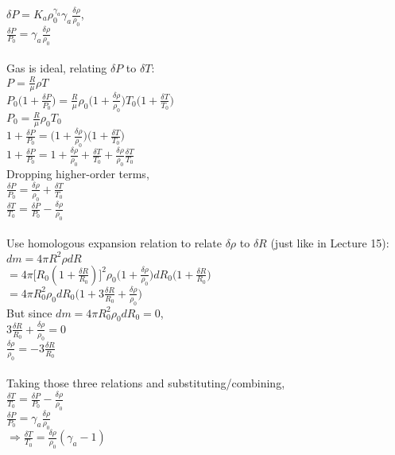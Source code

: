 \documentclass[]{article}
\begin{document}
\begin{enumerate}
{\begin{enumerate}
{		$\delta P = K_a \rho_0^{\gamma_a}\gamma_a\frac{\delta\rho}{\rho_0}$,
		\\
		$\frac{\delta P}{P_0} = \gamma_a\frac{\delta\rho}{\rho_0}$
		\\\\
		Gas is ideal, relating $\delta P$ to $\delta T$:
		\\
		$P = \frac{R}{\mu}\rho T$
		\\
		$P_0 \big(1 + \frac{\delta P}{P_0}\big) = \frac{R}{\mu}\rho_0\big(1+ \frac{\delta\rho}{\rho_0}\big) T_0\big(1 + \frac{\delta T}{T_0}\big)$
		\\
		$P_0 = \frac{R}{\mu}\rho_0 T_0$
		\\
		$1 + \frac{\delta P}{P_0} = \big(1+ \frac{\delta\rho}{\rho_0}\big) \big(1 + \frac{\delta T}{T_0}\big)$
		\\
		$1 + \frac{\delta P}{P_0} = 1+ \frac{\delta\rho}{\rho_0} + \frac{\delta T}{T_0} +  \frac{\delta\rho}{\rho_0} \frac{\delta T}{T_0}$
		\\
		Dropping higher-order terms,
		\\
		$\frac{\delta P}{P_0} = \frac{\delta\rho}{\rho_0} + \frac{\delta T}{T_0}$
		\\
		$ \frac{\delta T}{T_0} = \frac{\delta P}{P_0} - \frac{\delta\rho}{\rho_0}$
		\\\\
		Use homologous expansion relation to relate $\delta\rho$ to $\delta R$ (just like in Lecture 15):
		\\
		$dm = 4\pi R^2 \rho dR$
		\\
		$=4\pi \big[R_0 (1 + \frac{\delta R}{R_0})\big]^2 \rho_0\big(1+ \frac{\delta\rho}{\rho_0}\big) dR_0\big(1+\frac{\delta R}{R_0}\big)$
		\\
		$=4\pi R_0^2 \rho_0 dR_0\big(1 + 3\frac{\delta R}{R_0} + \frac{\delta\rho}{\rho_0})$
		\\
		But since $dm = 4\pi R_0^2 \rho_0 dR_0 = 0$, 
		\\
		$3\frac{\delta R}{R_0} + \frac{\delta\rho}{\rho_0} = 0$
		\\
		$\frac{\delta\rho}{\rho_0} = - 3\frac{\delta R}{R_0}$
		\\\\
		Taking those three relations and substituting/combining,
		\\
		$ \frac{\delta T}{T_0} = \frac{\delta P}{P_0} - \frac{\delta\rho}{\rho_0}$
		\\
		$\frac{\delta P}{P_0} = \gamma_a\frac{\delta\rho}{\rho_0}$
		\\
		$\Rightarrow \frac{\delta T}{T_0} =  \frac{\delta\rho}{\rho_0}(\gamma_a - 1)$
}
\end{enumerate}}
\end{enumerate}
\end{document}

